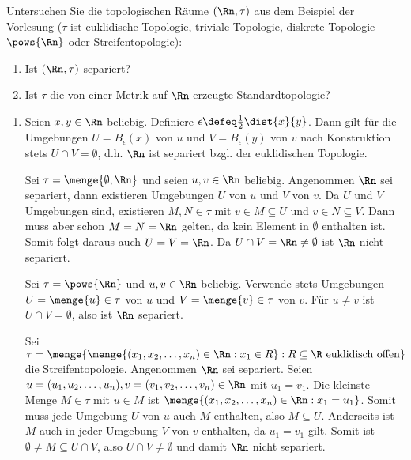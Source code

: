 \begin{exercisePage}
%
\begin{exercise}
	Untersuchen Sie die topologischen Räume $(\Rn, \tau)$ aus dem Beispiel der Vorlesung ($\tau$ ist euklidische Topologie, triviale Topologie, diskrete Topologie $\pows{\Rn}$ oder Streifentopologie):
	\begin{enumerate}[leftmargin=*, nolistsep, topsep=-\parskip]
		\item Ist $(\Rn , \tau)$ separiert?
		\item  Ist $\tau$ die von einer Metrik auf $\Rn$ erzeugte Standardtopologie?
	\end{enumerate}
\end{exercise}

\begin{enumerate}[leftmargin=\zulength, label=(zu \alph*)]
	\item Seien $x,y \in \Rn$ beliebig. Definiere $\epsilon \defeq \frac{1}{2} \dist{x}{y}$. Dann gilt für die Umgebungen $U = B_\epsilon(x)$ von $u$ und $V = B_\epsilon(y)$ von $v$ nach Konstruktion stets $U \cap V = \emptyset$, d.h. $\Rn$ ist separiert bzgl. der euklidischen Topologie.
	
	Sei $\tau = \menge{\emptyset, \Rn}$ und seien $u,v \in \Rn$ beliebig. Angenommen $\Rn$ sei separiert, dann existieren Umgebungen $U$ von $u$ und $V$ von $v$. Da $U$ und $V$ Umgebungen sind, existieren $M,N \in \tau$ mit $v \in M \subseteq U$ und $v \in N \subseteq V$. Dann muss aber schon $M = N = \Rn$ gelten, da kein Element in $\emptyset$ enthalten ist. Somit folgt daraus auch $U = V = \Rn$. Da $U \cap V = \Rn \neq \emptyset$ ist $\Rn$ nicht separiert.
	
	Sei $\tau = \pows{\Rn}$ und $u,v \in \Rn$ beliebig. Verwende stets Umgebungen $U = \menge{u} \in \tau$ von $u$ und $V = \menge{v} \in \tau$ von $v$. Für $u \neq v$ ist $U \cap V = \emptyset$, also ist $\Rn$ separiert.
	
	Sei $\tau = \menge{ \menge{(x_1,x_2, \dots, x_n) \in \Rn : x_1 \in R} : R \subseteq \R \text{ euklidisch offen}}$ die Streifentopologie. Angenommen $\Rn$ sei separiert.
	Seien $u = (u_1 , u_2, \dots, u_n), v = (v_1, v_2, \dots, v_n) \in \Rn$ mit $u_1 = v_1$. Die kleinste Menge $M \in \tau$ mit $u \in M$ ist $\menge{(x_1,x_2, \dots, x_n) \in \Rn : x_1 = u_1}$. Somit muss jede Umgebung $U$ von $u$ auch $M$ enthalten, also $M \subseteq U$. Anderseits ist $M$ auch in jeder Umgebung $V$ von $v$ enthalten, da $u_1 = v_1$ gilt. Somit ist $\emptyset \neq M \subseteq U \cap V$, also $U \cap V \neq \emptyset$ und damit $\Rn$ nicht separiert.
	

\end{enumerate}
\end{exercisePage}
